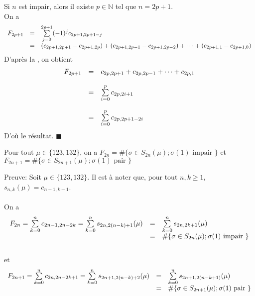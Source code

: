 	Si $n$ est impair, alors il existe $p\in \mathbb{N}$ tel que $n=2p+1$.\\
	On a \[
		\begin{array}{ l l l}
			F_{2p+1}&=&\sum\limits_{j=0}^{2p+1}(-1)^{j}c_{2p+1, 2p+1-j}\\
			&=&(c_{2p+1, 2p+1} - c_{2p+1, 2p}) + (c_{2p+1, 2p-1} - c_{2p+1, 2p-2})+ \cdots + (c_{2p+1, 1} - c_{2p+1, 0})
			\end{array}
	\]
	D'après la , on obtient
	\[
		\begin{array}{l l l}
			F_{2p+1} & =        & c_{2p, 2p+1} + c_{2p, 2p-1} + \cdots + c_{2p, 1} \\
			         & \text{ } &                                                  \\
			         & =        & \sum\limits_{i=0}^{p}c_{2p,2i+1}                 \\
			         & \text{ } &                                                  \\
			         & =        & \sum\limits_{i=0}^{p}c_{2p, 2p+1-2i}
		\end{array}
	\]
	D'où le résultat. \hspace{5pt} $\blacksquare$
	\text{ }\vspace{5pt}\\
	\begin{proposition}
		Pour tout $\mu \in \{123, 132\}$, on a $F_{2n}=\#\{ \sigma \in S_{2n}(\mu); \sigma(1) \text{ impair }\}$ et $F_{2n+1} = \#\{\sigma\in S_{2n+1}(\mu); \sigma(1) \text{ pair }\}$
	\end{proposition}
	Preuve: Soit $\mu \in \{123, 132\}$.
	Il est à noter que, pour tout $n, k\geq 1$, $s_{n, k}(\mu) = c_{n-1,k-1}$. \\ \text{}\vspace{5pt}\\
	On a \\
	\[
		\begin{array}{l l l}
			F_{2n} =  \sum\limits_{k=0}^{n}c_{2n-1, 2n-2k} = \sum\limits_{k=0}^{n}s_{2n, 2(n-k)+1}(\mu) &=& \sum\limits_{k=0}^{n}s_{2n, 2k+1}(\mu)\\
			&=& \#\{\sigma\in S_{2n}(\mu); \sigma(1) \text{ impair }\}
		\end{array}
	\]
	\text{}\\
	et
	\[
		\begin{array}{l l l}
			F_{2n+1} = \sum\limits_{k=0}^{n}c_{2n, 2n-2k+1} = \sum\limits_{k=0}^{n}s_{2n+1, 2(n-k)+2}(\mu) &=& \sum\limits_{k=0}^{n}s_{2n+1, 2(n-k+1)}(\mu)\\
			&=& \#\{\sigma\in S_{2n+1}(\mu); \sigma(1) \text{ pair }\}
		\end{array}
	\]
